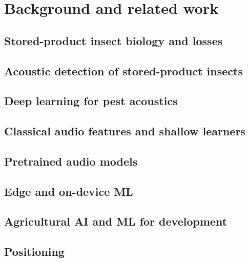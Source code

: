 \section{Background and related work}
\label{sec:related}

\subsection{Stored-product insect biology and losses}

\subsection{Acoustic detection of stored-product insects}

\subsection{Deep learning for pest acoustics}

\subsection{Classical audio features and shallow learners}

\subsection{Pretrained audio models}

\subsection{Edge and on-device ML}

\subsection{Agricultural AI and ML for development}

\subsection{Positioning}
